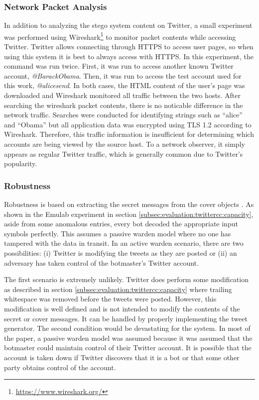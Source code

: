 \subsubsection{Network Packet Analysis}
In addition to analyzing the stego system content on Twitter, a small experiment
was performed using Wireshark\footnote{\url{https://www.wireshark.org/}} to
monitor packet contents while accessing Twitter.  Twitter allows connecting
through HTTPS to access user pages, so when using this system it is best
to always access with HTTPS.  In this experiment, the  command was
run twice.  First, it was run to access another known Twitter account,
\emph{@BarackObama}.  Then, it was run to access the test account used for
this work, \emph{@alicesend}.  In both cases, the HTML content of the user's
page was downloaded and Wireshark monitored all traffic between the two hosts.
After searching the wireshark packet contents, there is no noticable difference
in the network traffic.  Searches were conducted for identifying strings such
as ``alice'' and ``Obama'' but all application data was encrypted using TLS 1.2
according to Wireshark.  Therefore, this traffic information is insufficient
for determining which accounts are being viewed by the source host.  To a
network observer, it simply appears as regular Twitter traffic, which is
generally common due to Twitter's popularity.

\subsubsection{Robustness}
\label{subsec:evaluation:twittercc:robustness}

Robustness is based on extracting the secret messages from the cover objects
\cite{steganalysis}.  As shown in the Emulab experiment in section
\ref{subsec:evaluation:twittercc:capacity}, aside from some anomalous entries,
every bot decoded the appropriate input symbols perfectly.  This assumes a
passive warden model where no one has tampered with the data in transit.  In an
active warden scenario, there are two possibilities: (i) Twitter is modifying the tweets as they are posted or (ii) an adversary has taken control of the botmaster's Twitter account.

The first scenario is extremely unlikely.  Twitter does perform some modification
as described in section \ref{subsec:evaluation:twittercc:capacity} where trailing
\\whitespace was removed before the tweets were posted.  However, this modification
is well defined and is not intended to modify the contents of the secret or
cover messages.  It can be handled by properly implementing the tweet generator.
The second condition would be devastating for the system.  In most of the paper,
a passive warden model was assumed because it was assumed that the botmaster could
maintain control of their Twitter account.  It is possible that the account is
taken down if Twitter discovers that it is a bot or that some other party obtains
control of the account.  


